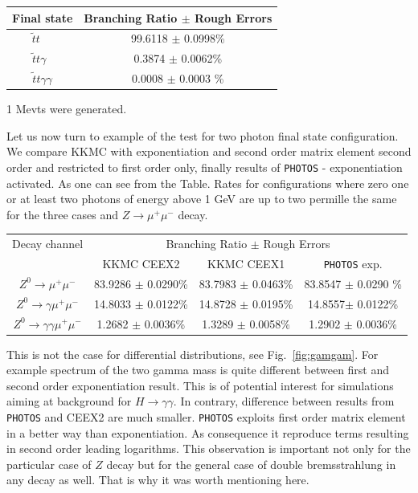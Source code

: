 \documentclass[]{Photos_interface_design}
\begin{document}
\vspace{0.3cm} 
\begin{center}
{ \begin{tabular}{|c|c |} 
\hline 
Final state &  Branching Ratio  $\pm$ Rough Errors \\  
\hline 
\hline 
{$ \widetilde{t} t \; \;\; \;$}  &  {99.6118 $\pm$  0.0998\%}  \\ 
\hline 
 {$  \widetilde{t} t \gamma \;\;$} &   { 0.3874 $\pm$  0.0062\%}   \\ 
\hline 
{$  \widetilde{t} t \gamma \gamma$}  &  { 0.0008 $\pm$  0.0003 \%}  \\ 
\hline 
\end{tabular} 
}  
\end{center} 
1 Mevts were generated. 

Let us now turn to example of the test for two photon final state configuration.
We compare KKMC \cite{} with exponentiation and second order matrix element 
second order and restricted to first order only, finally results of {\tt PHOTOS} - exponentiation activated. As one can see from the Table. Rates for configurations 
where zero one or at least two photons of energy above 1 GeV are up to two
permille the same for the three cases and $Z\to \mu^+\mu^-$ decay. 

{\centering \begin{tabular}{|c|c|c|c|} 
\hline 
Decay channel &\multicolumn{3}{|c|}{ Branching Ratio $\pm$ Rough Errors}  \\ 
      & {KKMC CEEX2} & {KKMC CEEX1} & {\tt PHOTOS} exp.\\ 
\hline 
\hline 
 {$Z^{0} \rightarrow \mu^{+} \mu^{-} $} & {83.9286 $\pm$  0.0290\%} &{  83.7983 $\pm$  0.0463\%} & 83.8547 $\pm$ 0.0290 \%\\ 
\hline 
\hline 
 {$Z^{0} \rightarrow \gamma \mu^{+} \mu^{-} $} & {14.8033 $\pm$  0.0122\%} &{  14.8728 $\pm$  0.0195\%} & 14.8557$\pm$ 0.0122\% \\ 
\hline 
\hline 
{$Z^{0} \rightarrow \gamma \gamma \mu^{+} \mu^{-} $} & { 1.2682 $\pm$  0.0036\%} &{   1.3289 $\pm$  0.0058\%} & 1.2902 $\pm$ 0.0036\%\\ 
\hline 
\end{tabular}\par} 
This is not the case for differential distributions, see Fig.~\ref{fig:gamgam}. For example spectrum of 
the two gamma mass is quite different between first and second order 
exponentiation result. This is of potential interest for simulations aiming at 
background for $H \to \gamma \gamma$. In contrary, difference between results from {\tt PHOTOS} and CEEX2 are much smaller. {\tt PHOTOS} exploits first order matrix element 
in a better way than exponentiation. As consequence it reproduce terms resulting in second order leading logarithms. This observation is important not only for 
the particular case of $Z$ decay but for the general case of double bremsstrahlung in any decay as well. That is why it was worth mentioning here.
\end{document}
